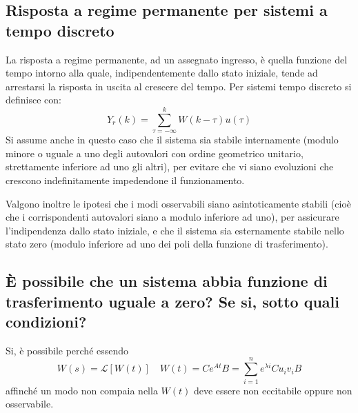 \documentclass{article}
\begin{document}
\subsection{Risposta a regime permanente per sistemi a tempo discreto}
La risposta a regime permanente, ad un assegnato ingresso, è quella funzione del tempo intorno alla quale, indipendentemente dallo stato iniziale,
tende ad arrestarsi la risposta in uscita al crescere del tempo.
Per sistemi tempo discreto si definisce con:
\[Y_r(k)=\sum_{\tau =- \infty}^{k} W(k-\tau)u(\tau) \]
Si assume anche in questo caso che il sistema sia stabile internamente (modulo minore o uguale a uno degli autovalori con ordine geometrico unitario,
strettamente inferiore ad uno gli altri), per evitare che vi siano evoluzioni che crescono
indefinitamente impedendone il funzionamento.

Valgono inoltre le ipotesi che i
modi osservabili siano asintoticamente stabili (cioè che i corrispondenti autovalori siano a modulo inferiore ad uno), per assicurare l'indipendenza dallo stato iniziale, e che
il sistema sia esternamente stabile nello stato zero (modulo inferiore ad uno dei
poli della funzione di trasferimento).

\subsection{È possibile che un sistema abbia funzione di trasferimento uguale a zero? Se si, sotto
quali condizioni?}
Si, è possibile perché essendo 
\[ W(s)=\mathscr{L}[W(t)] \quad W(t)=Ce^{At}B=\sum_{i=1}^{n}e^{\lambda i}Cu_iv_iB \]
affinché un modo non compaia nella $W(t)$ deve essere non eccitabile oppure non osservabile.
\end{document}
